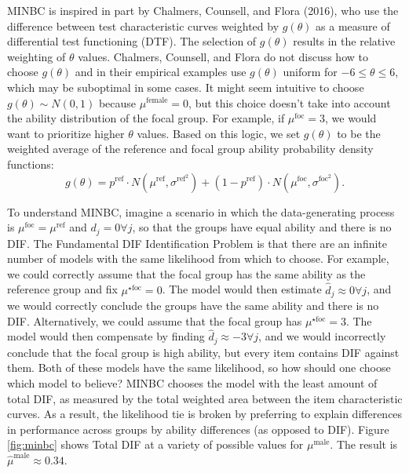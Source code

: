 \documentclass[
  english,
  man,floatsintext]{apa6}
\begin{document}
MINBC is inspired in part by Chalmers, Counsell, and Flora (2016), who use the difference between test characteristic curves weighted by \(g(\theta)\) as a measure of differential test functioning (DTF). The selection of \(g(\theta)\) results in the relative weighting of \(\theta\) values. Chalmers, Counsell, and Flora do not discuss how to choose \(g(\theta)\) and in their empirical examples use \(g(\theta)\) uniform for \(-6 \le \theta \le 6\), which may be suboptimal in some cases. It might seem intuitive to choose \(g(\theta) \sim N(0, 1)\) because \(\mu^\text{female} = 0\), but this choice doesn't take into account the ability distribution of the focal group. For example, if \(\mu^\text{foc} = 3\), we would want to prioritize higher \(\theta\) values. Based on this logic, we set \(g(\theta)\) to be the weighted average of the reference and focal group ability probability density functions:
\begin{equation}
g(\theta) = p^\text{ref} \cdot N(\mu^{\text{ref}}, \sigma^{\text{ref}^2}) + (1 - p^\text{ref}) \cdot N(\mu^{\text{foc}}, \sigma^{\text{foc}^2}).
\end{equation}

To understand MINBC, imagine a scenario in which the data-generating process is \(\mu^{\text{foc}} = \mu^{\text{ref}}\) and \(d_j = 0 \forall j\), so that the groups have equal ability and there is no DIF. The Fundamental DIF Identification Problem is that there are an infinite number of models with the same likelihood from which to choose. For example, we could correctly assume that the focal group has the same ability as the reference group and fix \(\mu^{\star\text{foc}} = 0\). The model would then estimate \(\hat d_j \approx 0 \forall j\), and we would correctly conclude the groups have the same ability and there is no DIF. Alternatively, we could assume that the focal group has \(\mu^{\star\text{foc}} = 3\). The model would then compensate by finding \(\hat d_j \approx -3 \forall j\), and we would incorrectly conclude that the focal group is high ability, but every item contains DIF against them. Both of these models have the same likelihood, so how should one choose which model to believe? MINBC chooses the model with the least amount of total DIF, as measured by the total weighted area between the item characteristic curves. As a result, the likelihood tie is broken by preferring to explain differences in performance across groups by ability differences (as opposed to DIF). Figure \ref{fig:minbc} shows Total DIF at a variety of possible values for \(\mu^\text{male}\). The result is \(\hat \mu^\text{male} \approx 0.34\).
\end{document}

